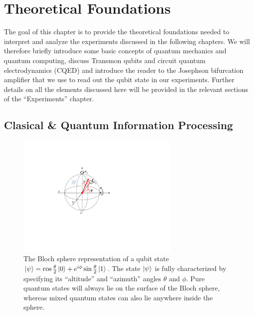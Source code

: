 \chapter{Theoretical Foundations}

The goal of this chapter is to provide the theoretical foundations needed to interpret and analyze the experiments discussed in the following chapters. We will therefore briefly introduce some basic concepts of quantum mechanics and quantum computing, discuss Transmon qubits and circuit quantum electrodynamics (CQED) and introduce the reader to the Josephson bifurcation amplifier that we use to read out the qubit state in our experiments. Further details on all the elements discussed here will be provided in the relevant sections of the ``Experiments'' chapter.

\section{Clasical \& Quantum Information Processing}

\begin{figure}
	\includegraphics[width=8cm]{"./material/figures/introduction/bloch_sphere"}
	\caption{The Bloch sphere representation of a qubit state $\left| \psi \right> = \cos{\frac{\theta}{2}}\left| 0 \right>+e^{i\phi}\sin{\frac{\theta}{2}}\left| 1 \right>$. The state $\left| \psi \right>$ is fully characterized by specifying its ``altitude'' and ``azimuth'' angles $\theta$ and $\phi$. Pure quantum states will always lie on the surface of the Bloch sphere, whereas mixed quantum states can also lie anywhere inside the sphere.}
	\label{fig:BlochSphere}
\end{figure}

